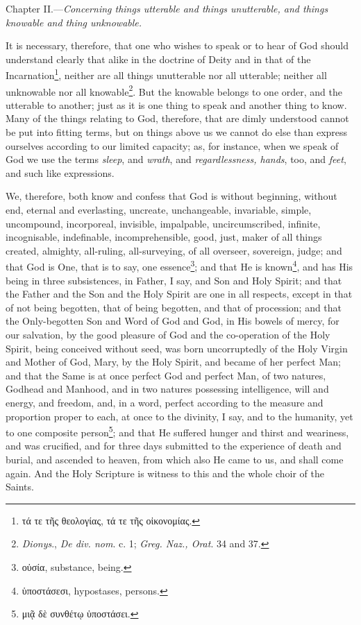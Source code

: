 
Chapter II.—\emph{Concerning things utterable and things unutterable, and things knowable and thing unknowable.}

It is necessary, therefore, that one who wishes to speak or to hear of God should understand clearly that alike in the doctrine of Deity and in that of the Incarnation\footnote{\textgreek{τά τε τῆς θεολογίας, τά τε τῆς οἰκονομίας}.}, neither are all things unutterable nor all utterable; neither all unknowable nor all knowable\footnote{\emph{Dionys}., \emph{De div. nom}. c. 1; \emph{Greg. Naz., Orat}. 34 and 37.}. But the knowable belongs to one order, and the utterable to another; just as it is one thing to speak and another thing to know. Many of the things relating to God, therefore, that are dimly understood cannot be put into fitting terms, but on things above us we cannot do else than express ourselves according to our limited capacity; as, for instance, when we speak of God we use the terms \emph{sleep}, and \emph{wrath}, and \emph{regardlessness, hands}, too, and \emph{feet}, and such like expressions.

We, therefore, both know and confess that God is without beginning, without end, eternal and everlasting, uncreate, unchangeable, invariable, simple, uncompound, incorporeal, invisible, impalpable, uncircumscribed, infinite, incognisable, indefinable, incomprehensible, good, just, maker of all things created, almighty, all-ruling, all-surveying, of all overseer, sovereign, judge; and that God is One, that is to say, one essence\footnote{\textgreek{οὐσία}, substance, being.}; and that He is known\footnote{\textgreek{ὑποστάσεσι}, hypostases, persons.}, and has His being in three subsistences, in Father, I say, and Son and Holy Spirit; and that the Father and the Son and the Holy Spirit are one in all respects, except in that of not being begotten, that of being begotten, and that of procession; and that the Only-begotten Son and Word of God and God, in His bowels of mercy, for our salvation, by the good pleasure of God and the co-operation of the Holy Spirit, being conceived without seed, was born uncorruptedly of the Holy Virgin and Mother of God, Mary, by the Holy Spirit, and became of her perfect Man; and that the Same is at once perfect God and perfect Man, of two natures, Godhead and Manhood, and in two natures possessing intelligence, will and energy, and freedom, and, in a word, perfect according to the measure and proportion proper to each, at once to the divinity, I say, and to the humanity, yet to one composite person\footnote{\textgreek{μιᾷ δὲ συνθέτῳ ὑποστάσει}.}; and that He suffered hunger and thirst and weariness, and was crucified, and for three days submitted to the experience of death and burial, and ascended to heaven, from which also He came to us, and shall come again. And the Holy Scripture is witness to this and the whole choir of the Saints.

